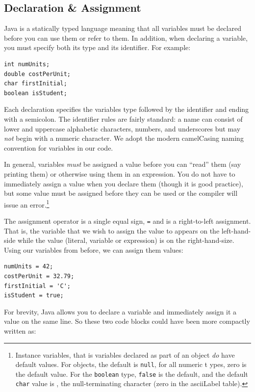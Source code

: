 \subsection{Declaration \& Assignment}

Java is a statically typed language meaning that all variables must be declared
before you can use them or refer to them.  In addition, when declaring a variable, 
you must specify both its type and its identifier.  For example:

\begin{verbatim}
int numUnits;
double costPerUnit;
char firstInitial;
boolean isStudent;
\end{verbatim}

Each declaration specifies the variables type followed by the 
identifier and ending with a semicolon.  The identifier rules are 
fairly standard: a name can consist of lower and uppercase 
alphabetic characters, numbers, and underscores but may 
\emph{not} begin with a numeric character.  We adopt the 
modern camelCasing naming convention for variables in our 
code.

In general, variables \emph{must} be assigned a value before
you can ``read'' them (say printing them) or otherwise using them
in an expression.  You do not have to immediately assign a value
when you declare them (though it is good practice), but some value
must be assigned before they can be used or the compiler
will issue an error.\footnote{Instance variables, that is variables
declared as part of an object \emph{do} have default values.
For objects, the default is \texttt{null}, for all numeric t
ypes, zero is the default value.  For the \texttt{boolean} 
type, \texttt{false} is the default, and the default 
\texttt{char} value is \texttt{\0}, the 
null-terminating character (zero in the \gls{asciiLabel} table).}

The assignment operator is a single equal sign, \texttt{=} and is a right-to-left
assignment.  That is, the variable that we wish to assign the value to appears on the
left-hand-side while the value (literal, variable or expression) is on the right-hand-size.
Using our variables from before, we can assign them values:

\begin{verbatim}
numUnits = 42;
costPerUnit = 32.79;
firstInitial = 'C';
isStudent = true;
\end{verbatim}

For brevity, Java allows you to declare a variable and immediately assign 
it a value on the same line.  So these two code blocks could have been 
more compactly written as:

